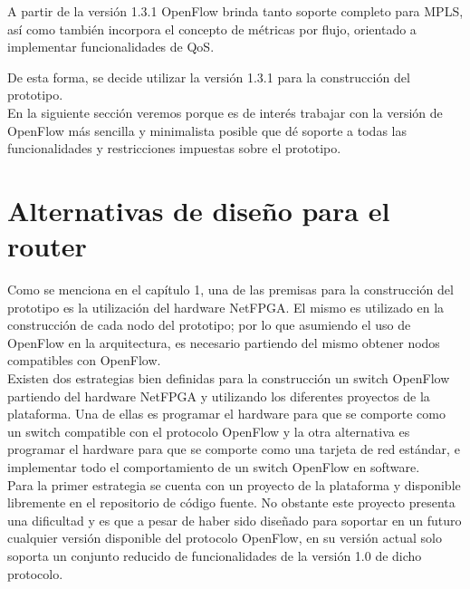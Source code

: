 A partir de la versión 1.3.1 OpenFlow brinda tanto soporte completo para MPLS, así como también incorpora el concepto de métricas por flujo, orientado a implementar funcionalidades de QoS. 

De esta forma, se decide utilizar la versión 1.3.1 para la construcción del prototipo.\\



En la siguiente secci\'on veremos porque es de inter\'es trabajar con la versi\'on de OpenFlow m\'as sencilla y minimalista posible que d\'e soporte a todas las funcionalidades y restricciones impuestas sobre el prototipo.\\ 

\section[Alternativas de dise\~no para el router]{Alternativas de dise\~no para el router}

Como se menciona en el cap\'itulo 1, una de las premisas para la construcción del prototipo es la utilizaci\'on del hardware NetFPGA. El mismo es utilizado en la construcción de cada nodo del prototipo; por lo que asumiendo el uso de OpenFlow en la arquitectura, es necesario partiendo del mismo obtener nodos compatibles con OpenFlow.\\ 

Existen dos estrategias bien definidas para la construcci\'on un switch OpenFlow partiendo del hardware NetFPGA y utilizando los diferentes proyectos de la plataforma. Una de ellas es programar el hardware para que se comporte como un switch compatible con el protocolo OpenFlow y la otra alternativa es programar el hardware para que se comporte como una tarjeta de red estándar, e implementar todo el comportamiento de un switch OpenFlow en software.\\

Para la primer estrategia se cuenta con un proyecto de la plataforma y disponible libremente en el repositorio de c\'odigo fuente. No obstante este proyecto presenta una dificultad y es que a pesar de haber sido dise\~nado para soportar en un futuro cualquier versi\'on disponible del protocolo OpenFlow, en su versi\'on actual solo soporta un conjunto reducido de funcionalidades de la versi\'on 1.0 de dicho protocolo. 

